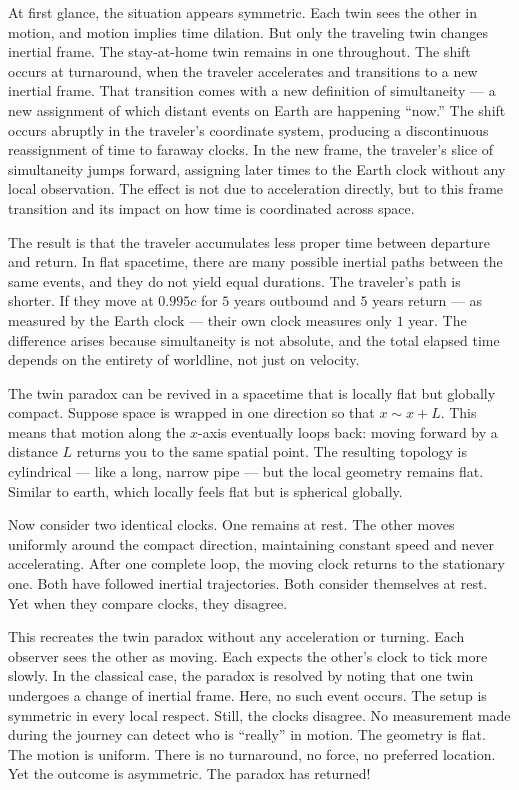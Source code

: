 At first glance, the situation appears symmetric. Each twin sees the other in motion, and motion implies time dilation. But only the traveling twin changes inertial frame. The stay-at-home twin remains in one throughout. The shift occurs at turnaround, when the traveler accelerates and transitions to a new inertial frame. That transition comes with a new definition of simultaneity — a new assignment of which distant events on Earth are happening “now.” The shift occurs abruptly in the traveler's coordinate system, producing a discontinuous reassignment of time to faraway clocks. In the new frame, the traveler's slice of simultaneity jumps forward, assigning later times to the Earth clock without any local observation. The effect is not due to acceleration directly, but to this frame transition and its impact on how time is coordinated across space.

The result is that the traveler accumulates less proper time between departure and return. In flat spacetime, there are many possible inertial paths between the same events, and they do not yield equal durations. The traveler’s path is shorter. If they move at $0.995c$ for $5$ years outbound and $5$ years return — as measured by the Earth clock — their own clock measures only $1$ year. The difference arises because simultaneity is not absolute, and the total elapsed time depends on the entirety of worldline, not just on velocity.

The twin paradox can be revived in a spacetime that is locally flat but globally compact. Suppose space is wrapped in one direction so that $x \sim x + L$. This means that motion along the $x$-axis eventually loops back: moving forward by a distance $L$ returns you to the same spatial point. The resulting topology is cylindrical — like a long, narrow pipe — but the local geometry remains flat. Similar to earth, which locally feels flat but is spherical globally.

Now consider two identical clocks. One remains at rest. The other moves uniformly around the compact direction, maintaining constant speed and never accelerating. After one complete loop, the moving clock returns to the stationary one. Both have followed inertial trajectories. Both consider themselves at rest. Yet when they compare clocks, they disagree.

This recreates the twin paradox without any acceleration or turning. Each observer sees the other as moving. Each expects the other’s clock to tick more slowly. In the classical case, the paradox is resolved by noting that one twin undergoes a change of inertial frame. Here, no such event occurs. The setup is symmetric in every local respect. Still, the clocks disagree. No measurement made during the journey can detect who is “really” in motion. The geometry is flat. The motion is uniform. There is no turnaround, no force, no preferred location. Yet the outcome is asymmetric. The paradox has returned!

